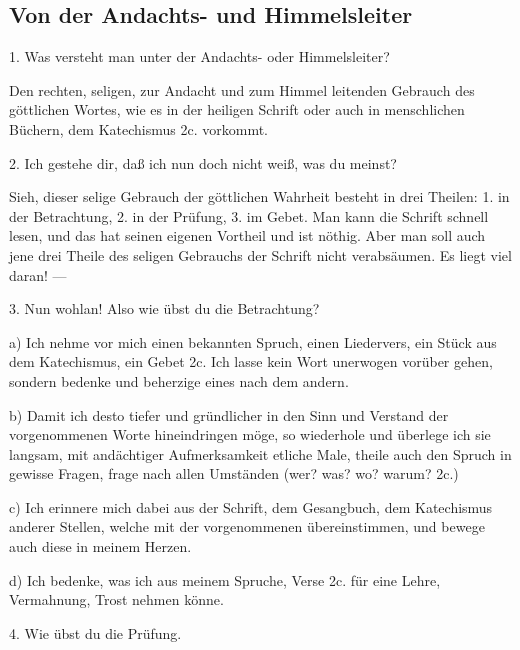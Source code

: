 \subsection{Von der Andachts- und Himmelsleiter}

1. Was versteht man unter der Andachts- oder Himmelsleiter?

Den rechten, seligen, zur Andacht und zum Himmel leitenden Gebrauch des göttlichen Wortes, wie es in der heiligen Schrift oder auch in menschlichen Büchern, dem Katechismus 2c. vorkommt.

2. Ich gestehe dir, daß ich nun doch nicht weiß, was du meinst?

Sieh, dieser selige Gebrauch der göttlichen Wahrheit besteht in drei Theilen: 1. in der Betrachtung, 2. in der Prüfung, 3. im Gebet. Man kann die Schrift schnell lesen, und das hat seinen eigenen Vortheil und ist nöthig. Aber man soll auch jene drei Theile des seligen Gebrauchs der Schrift nicht verabsäumen. Es liegt viel daran! —

3. Nun wohlan! Also wie übst du die Betrachtung?

a) Ich nehme vor mich einen bekannten Spruch, einen Liedervers, ein Stück aus dem Katechismus, ein Gebet 2c. Ich lasse kein Wort unerwogen vorüber gehen, sondern bedenke und beherzige eines nach dem andern.

b) Damit ich desto tiefer und gründlicher in den Sinn und Verstand der vorgenommenen Worte hineindringen möge, so wiederhole und überlege ich sie langsam, mit andächtiger Aufmerksamkeit etliche Male, theile auch den Spruch in gewisse Fragen, frage nach allen Umständen (wer? was? wo? warum? 2c.)

c) Ich erinnere mich dabei aus der Schrift, dem Gesangbuch, dem Katechismus anderer Stellen, welche mit der vorgenommenen übereinstimmen, und bewege auch diese in meinem Herzen.

d) Ich bedenke, was ich aus meinem Spruche, Verse 2c. für eine Lehre, Vermahnung, Trost nehmen könne.

4. Wie übst du die Prüfung.

